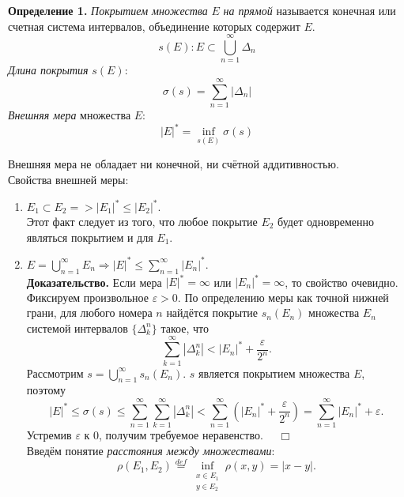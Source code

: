 \documentclass[12pt,a4paper, titlepage]{article}
\begin{document}
\textbf{Определение 1.} \textit{Покрытием множества} $E$ \textit{на прямой} называется конечная или счетная система интервалов, объединение которых содержит $E$.
$$
s(E): E \subset \bigcup^\infty_{n=1} \Delta_n
$$
\textit{Длина покрытия} $s(E)$:
$$ \sigma(s) = \sum^\infty_{n=1} |\Delta_n| $$
\textit{Внешняя мера} множества $E$:
$$
|E|^* = \inf_{s(E)} \sigma(s)
$$

Внешняя мера не обладает ни конечной, ни счётной аддитивностью.\\

Свойства внешней меры:
\begin{enumerate}
\item $E_1 \subset E_2 => |E_1|^* \leqslant |E_2|^*.$\\
Этот факт следует из того, что любое покрытие $E_2$ будет одновременно являться покрытием и для $E_1$.
\item $E = \bigcup\limits^\infty_{n=1} E_n \Rightarrow |E|^* \leqslant \sum\limits^\infty_{n=1} |E_n|^*.$ \smallskip\\
\textbf{Доказательство.}
Если мера $|E|^* = \infty$ или $|E_n|^* = \infty$, то свойство очевидно.
Фиксируем произвольное $\varepsilon > 0$. По определению меры как точной нижней грани, для любого номера $n$ найдётся покрытие $s_n(E_n)$ множества $E_n$ системой интервалов $\lbrace \Delta^n_k \rbrace$ такое, что 
$$
\sum^\infty_{k=1} |\Delta^n_k| < |E_n|^* + \frac{\varepsilon}{2^n}.
$$
Рассмотрим $s = \bigcup\limits^\infty_{n=1} s_n(E_n)$. $s$ является покрытием множества $E$, поэтому 
$$
|E|^* \leqslant \sigma(s) \leqslant \sum^\infty_{n=1} \sum^\infty_{k=1} |\Delta^n_k| < \sum^\infty_{n=1} (|E_n|^* + \frac{\varepsilon}{2^n}) = \sum^\infty_{n=1} |E_n|^* + \varepsilon.
$$
Устремив $\varepsilon$ к 0, получим требуемое неравенство. $\quad \Box$\\

Введём понятие \textit{расстояния между множествами}:
$$
\rho(E_1, E_2) \stackrel{def}{=} \inf_{\substack{x \in E_1 \\ y \in E_2}} \rho(x, y) = |x - y|.
$$


\end{enumerate}
\end{document}
